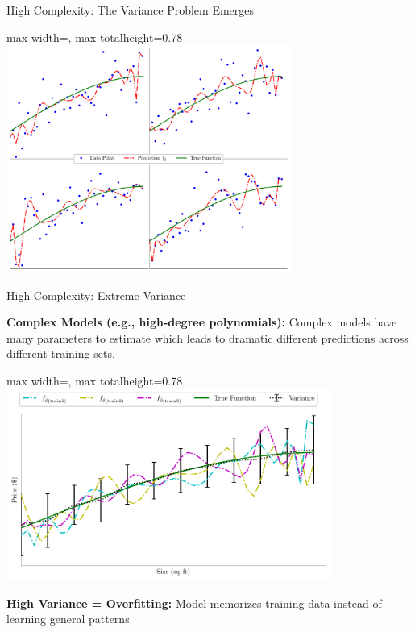 \documentclass[10pt]{beamer}
\newcommand{\fitpic}[1]{\begin{adjustbox}{max width=\linewidth, max totalheight=0.78\textheight}#1\end{adjustbox}}
\begin{document}
\begin{frame}{High Complexity: The Variance Problem Emerges}
\begin{center}
\fitpic{\includegraphics[width=0.7\textwidth]{../assets/bias-variance/figures/var3_latexify.pdf}}
\end{center}


\end{frame}

\begin{frame}{High Complexity: Extreme Variance}
\begin{keypointsbox}
\textbf{Complex Models (e.g., high-degree polynomials):} Complex models have  many parameters to estimate which leads to dramatic different predictions across different training sets.

\end{keypointsbox}

\begin{center}
\fitpic{\includegraphics[width=0.8\textwidth]{../assets/bias-variance/figures/var4_latexify.pdf}}
\end{center}

\begin{alertbox}
\textbf{High Variance = Overfitting:} Model memorizes training data instead of learning general patterns
\end{alertbox}
\end{frame}
\end{document}
